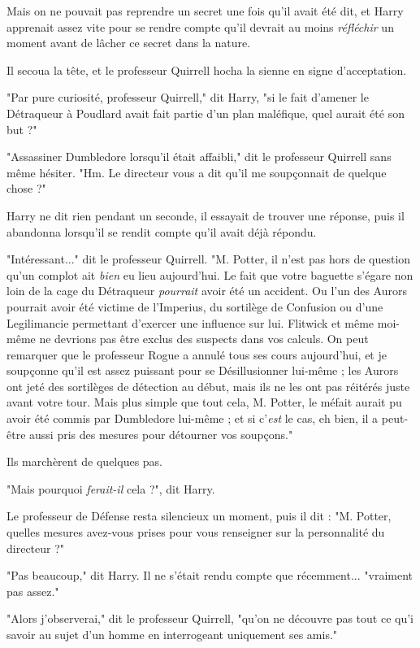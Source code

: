 Mais on ne pouvait pas reprendre un secret une fois qu'il avait été dit, et Harry apprenait assez vite pour se rendre compte qu'il devrait au moins \emph{réfléchir}  un moment avant de lâcher ce secret dans la nature.

Il secoua la tête, et le professeur Quirrell hocha la sienne en signe d'acceptation.

"Par pure curiosité, professeur Quirrell," dit Harry, "si le fait d'amener le Détraqueur à Poudlard avait fait partie d'un plan maléfique, quel aurait été son but ?"

"Assassiner Dumbledore lorsqu'il était affaibli," dit le professeur Quirrell sans même hésiter. "Hm. Le directeur vous a dit qu'il me soupçonnait de quelque chose ?"

Harry ne dit rien pendant un seconde, il essayait de trouver une réponse, puis il abandonna lorsqu'il se rendit compte qu'il avait déjà répondu.

"Intéressant..." dit le professeur Quirrell. "M. Potter, il n'est pas hors de question qu'un complot ait \emph{bien}  eu lieu aujourd'hui. Le fait que votre baguette s'égare non loin de la cage du Détraqueur \emph{pourrait}  avoir été un accident. Ou l'un des Aurors pourrait avoir été victime de l'Imperius, du sortilège de Confusion ou d'une Legilimancie permettant d'exercer une influence sur lui. Flitwick et même moi-même ne devrions pas être exclus des suspects dans vos calculs. On peut remarquer que le professeur Rogue a annulé tous ses cours aujourd'hui, et je soupçonne qu'il est assez puissant pour se Désillusionner lui-même ; les Aurors ont jeté des sortilèges de détection au début, mais ils ne les ont pas réitérés juste avant votre tour. Mais plus simple que tout cela, M. Potter, le méfait aurait pu avoir été commis par Dumbledore lui-même ; et si c'\emph{est}  le cas, eh bien, il a peut-être aussi pris des mesures pour détourner vos soupçons."

Ils marchèrent de quelques pas.

"Mais pourquoi \emph{ferait-il}  cela ?", dit Harry.

Le professeur de Défense resta silencieux un moment, puis il dit : "M. Potter, quelles mesures avez-vous prises pour vous renseigner sur la personnalité du directeur ?"

"Pas beaucoup," dit Harry. Il ne s'était rendu compte que récemment... "vraiment pas assez."

"Alors j'observerai," dit le professeur Quirrell, "qu'on ne découvre pas tout ce qu'i savoir au sujet d'un homme en interrogeant uniquement ses amis."

